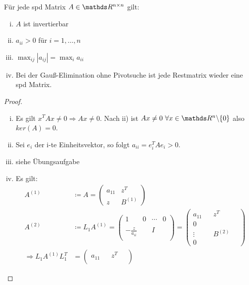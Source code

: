 \begin{Satze}
  \label{4.2.1}
  Für jede spd Matrix $A\in \Renn $ gilt:
  \begin{enumerate}[i)]	
  \item $A$ ist invertierbar
  \item $a_{ii}>0$ für $i=1, \dots , n$
  \item $\max_{ij}|a_{ij}| = \max_{i}a_{ii}$
  \item Bei der Gauß-Elimination ohne Pivotsuche ist jede Restmatrix wieder eine spd Matrix.
  \end{enumerate}
\end{Satze}

\begin{proof}~
  \begin{enumerate}[i)]
  \item Es gilt $x^TAx\neq 0\Rightarrow Ax\neq 0$. 
    Nach ii) ist $Ax\neq 0~\forall x\in\Ren\backslash \{0\}$
    also $ker(A)=0$. %
  \item Sei $e_i$ der i-te Einheitsvektor, so folgt $a_{ii} = e_{i}^TAe_i > 0$.
  \item siehe Übungsaufgabe
  \item Es gilt:
    \begin{align*}
      A^{(1)} &\coloneqq A = \begin{pmatrix}
        a_{11} & z^T \\ 
        z			& B^{(1)}
      \end{pmatrix} \\
      A^{(2)}	&\coloneqq L_1 A^{(1)} 
                  = \begin{pmatrix}
                    1 & 0 & \dotsm & 0 \\ \\
                    -\frac{z}{a_{ii}} && I \\ ~
                  \end{pmatrix} 
      = \begin{pmatrix}
        a_{11} &  & z^T & ~ \\ 
        0 \\
        \vdots && B^{(2)} \\ 
        0
      \end{pmatrix} \\
      \Rightarrow L_1A^{(1)}L_1^T  
              &= \begin{pmatrix}
		a_{11} &  & z^T & ~ \\ 

\end{pmatrix}
\end{align*}
\end{enumerate}
\end{proof}

